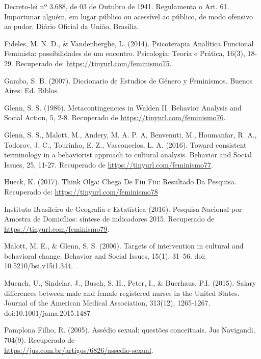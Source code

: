 \hangindent=25pt
\noindent Decreto-lei nº 3.688, de 03 de Outubro de 1941. Regulamenta o Art. 61. Importunar alguém, em lugar público ou acessível ao público, de modo ofensivo ao pudor. Diário Oficial da União, Brasília.

\hangindent=25pt
\noindent Fideles, M. N. D., \& Vandenberghe, L. (2014). Psicoterapia Analítica Funcional Feminista: possibilidades de um encontro. Psicologia: Teoria e Prática, 16(3), 18-29. Recuperado de: \url{https://tinyurl.com/feminismo75}.

\hangindent=25pt
\noindent Gamba, S. B. (2007). Diccionario de Estudios de Género y Feminismos. Buenos Aires: Ed. Biblos.

\hangindent=25pt
\noindent Glenn, S. S. (1986). Metacontingencies in Walden II. Behavior Analysis and Social Action, 5, 2-8. Recuperado de \url{https://tinyurl.com/feminismo76}.

\hangindent=25pt
\noindent Glenn, S. S., Malott, M., Andery, M. A. P. A, Benvenuti, M., Houmanfar, R. A., Todorov, J. C., Tourinho, E. Z., Vasconcelos, L. A. (2016). Toward consistent terminology in a behaviorist approach to cultural analysis. Behavior and Social Issues, 25, 11-27. Recuperado de \url{https://tinyurl.com/feminismo77}.

\hangindent=25pt
\noindent Hueck, K. (2017). Think Olga: Chega De Fiu Fiu: Resultado Da Pesquisa. Recuperado de: \url{https://tinyurl.com/feminismo78}

\hangindent=25pt
\noindent Instituto Brasileiro de Geografia e Estatística (2016). Pesquisa Nacional por Amostra de Domicílios: síntese de indicadores 2015. Recuperado de \url{https://tinyurl.com/feminismo79}.

\hangindent=25pt
\noindent Malott, M. E., \& Glenn, S. S. (2006). Targets of intervention in cultural and behavioral change. Behavior and Social Issues, 15(1), 31–56. doi: 10.5210/bsi.v15i1.344.

\hangindent=25pt
\noindent Muench, U., Sindelar, J., Busch, S. H., Peter, I., \& Buerhaus, P.I. (2015). Salary differences between male and female registered nurses in the United States. Journal of the American Medical Association, 313(12), 1265-1267. doi:10.1001/jama.2015.1487 

\hangindent=25pt
\noindent Pamplona Filho, R. (2005). Assédio sexual: questões conceituais. Jus Navigandi, 704(9). Recuperado de\\ \url{https://jus.com.br/artigos/6826/assedio-sexual}.

